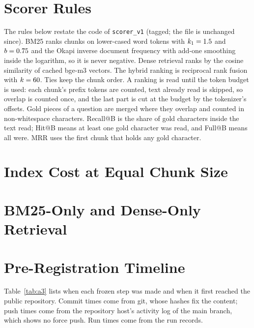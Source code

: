 \FloatBarrier
\section{Scorer Rules}
\label{app:scorer}

The rules below restate the code of \texttt{scorer\_v1} (tagged; the file
is unchanged since). BM25 ranks chunks on lower-cased word tokens with
$k_1=1.5{}$ and $b=0.75{}$ and the Okapi inverse document frequency
with add-one smoothing inside the logarithm, so it is never negative. Dense retrieval ranks by the cosine
similarity of cached bge-m3 vectors. The hybrid ranking is reciprocal rank
fusion with $k=60{}$. Ties keep the chunk order. A ranking is read
until the token budget is used: each chunk's prefix tokens are counted,
text already read is skipped, so overlap is counted once, and the last
part is cut at the budget by the tokenizer's offsets. Gold pieces of a
question are merged where they overlap and counted in non-whitespace
characters. Recall@B is the share of gold characters inside the text
read; Hit@B means at least one gold character was read, and Full@B means
all were. MRR uses the first chunk that holds any gold character.

\FloatBarrier
\section{Index Cost at Equal Chunk Size}
\label{app:index-cost}
\begin{table}[!htb]
\centering
{}
\caption{Index cost of three chunkers at the same target size, mean per document.}
\label{tab:a1}
\end{table}

\FloatBarrier
\section{BM25-Only and Dense-Only Retrieval}
\label{app:retrievers}
\begin{table}[!htb]
\centering
{}
\caption{The primary analysis of RQ1 under each retriever.}
\label{tab:a2}
\end{table}

\FloatBarrier
\section{Pre-Registration Timeline}
\label{app:timeline}

Table~\ref{tab:a3} lists when each frozen step was made and when it
first reached the public repository. Commit times come from git, whose
hashes fix the content; push times come from the repository host's
activity log of the main branch, which shows no force push. Run times
come from the run records.

